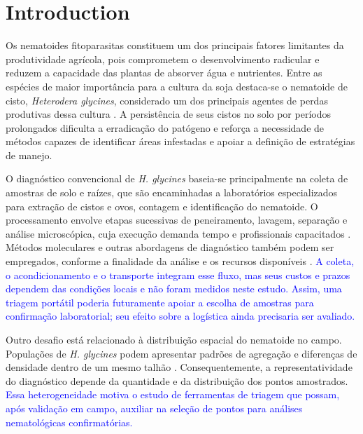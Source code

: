 \section{Introduction}
\label{Introduction}

Os nematoides fitoparasitas constituem um dos principais fatores limitantes da produtividade agrícola, pois comprometem o desenvolvimento radicular e reduzem a capacidade das plantas de absorver água e nutrientes. Entre as espécies de maior importância para a cultura da soja destaca-se o nematoide de cisto, \textit{Heterodera glycines}, considerado um dos principais agentes de perdas produtivas dessa cultura \cite{bent2022}. A persistência de seus cistos no solo por períodos prolongados dificulta a erradicação do patógeno e reforça a necessidade de métodos capazes de identificar áreas infestadas e apoiar a definição de estratégias de manejo.

O diagnóstico convencional de \textit{H. glycines} baseia-se principalmente na coleta de amostras de solo e raízes, que são encaminhadas a laboratórios especializados para extração de cistos e ovos, contagem e identificação do nematoide. O processamento envolve etapas sucessivas de peneiramento, lavagem, separação e análise microscópica, cuja execução demanda tempo e profissionais capacitados \cite{arjoune2022,mahecha2022,pun2024}. Métodos moleculares e outras abordagens de diagnóstico também podem ser empregados, conforme a finalidade da análise e os recursos disponíveis \cite{shao2023}. \textcolor{blue}{A coleta, o acondicionamento e o transporte integram esse fluxo, mas seus custos e prazos dependem das condições locais e não foram medidos neste estudo. Assim, uma triagem portátil poderia futuramente apoiar a escolha de amostras para confirmação laboratorial; seu efeito sobre a logística ainda precisaria ser avaliado.}

Outro desafio está relacionado à distribuição espacial do nematoide no campo. Populações de \textit{H. glycines} podem apresentar padrões de agregação e diferenças de densidade dentro de um mesmo talhão \cite{avendano2003,poromarto2019}. Consequentemente, a representatividade do diagnóstico depende da quantidade e da distribuição dos pontos amostrados. \textcolor{blue}{Essa heterogeneidade motiva o estudo de ferramentas de triagem que possam, após validação em campo, auxiliar na seleção de pontos para análises nematológicas confirmatórias.}

